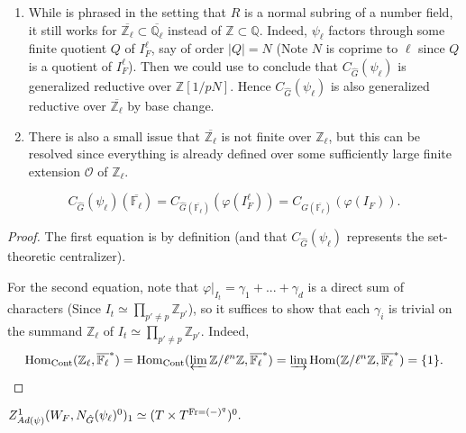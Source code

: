 \begin{remark}\label{Remark condition}
	\begin{enumerate}
		\item While \cite[Lemma 3.2]{dat2022ihes} is phrased in the setting that $R$ is a normal subring of a number field, it still works for $\overline{\mathbb{Z}_{\ell}} \subset \overline{\mathbb{Q}_{\ell}}$ instead of $\mathbb{Z} \subset \mathbb{Q}$. Indeed, $\psi_{\ell}$ factors through some finite quotient $Q$ of $I_F^{\ell}$, say of order $|Q|=N$ (Note $N$ is coprime to $\ell$ since $Q$ is a quotient of $I_F^{\ell}$). Then we could use \cite[Lemma 3.2]{dat2022ihes} to conclude that $C_{\hat{G}}(\psi_{\ell})$ is generalized reductive over $\mathbb{Z}[1/pN]$. Hence $C_{\hat{G}}(\psi_{\ell})$ is also generalized reductive over $\overline{\mathbb{Z}_{\ell}}$ by base change.
		\item There is also a small issue that $\overline{\mathbb{Z}_{\ell}}$ is not finite over $\mathbb{Z}_{\ell}$, but this can be resolved since everything is already defined over some sufficiently large finite extension $\mathcal{O}$ of $\mathbb{Z}_{\ell}$.
	\end{enumerate}
\end{remark}

\begin{lemma}\label{Lem I_F^ell}
	$$C_{\hat{G}}(\psi_{\ell})(\overline{\mathbb{F}_{\ell}})=C_{\hat{G}(\overline{\mathbb{F}_{\ell}})}(\varphi(I_F^\ell))=C_{\hat{G}(\overline{\mathbb{F}_{\ell}})}(\varphi(I_F)).$$
\end{lemma}

\begin{proof}
	The first equation is by definition (and that $C_{\hat{G}}(\psi_{\ell})$ represents the set-theoretic centralizer).
	
	For the second equation, note that $\varphi|_{I_t}=\gamma_1 + ...+ \gamma_d$ is a direct sum of characters (Since $I_t \simeq \prod_{p'\neq p}\mathbb{Z}_{p'}$), so it suffices to show that each $\gamma_i$ is trivial on the summand $\mathbb{Z}_{\ell}$ of $I_t\simeq \prod_{p'\neq p}\mathbb{Z}_{p'}$.
	Indeed,
	$$\operatorname{\operatorname{Hom}}_{\operatorname{Cont}}(\mathbb{Z}_{\ell}, \overline{\mathbb{F}_{\ell}}^*)=\operatorname{\operatorname{Hom}}_{\operatorname{Cont}}(\varprojlim\mathbb{Z}/\ell^n\mathbb{Z}, \overline{\mathbb{F}_{\ell}}^*)=\varinjlim\operatorname{\operatorname{Hom}}(\mathbb{Z}/\ell^n\mathbb{Z}, \overline{\mathbb{F}_{\ell}}^*)=\{1\}.$$
\end{proof}

\begin{lemma}\label{Lem_Z^1()_1}
	$Z^1_{Ad(\psi)}(W_F, N_{\hat{G}}(\psi_{\ell})^0)_1 \simeq (T \times T^{\operatorname{Fr}=(-)^q})^0.$
\end{lemma}

